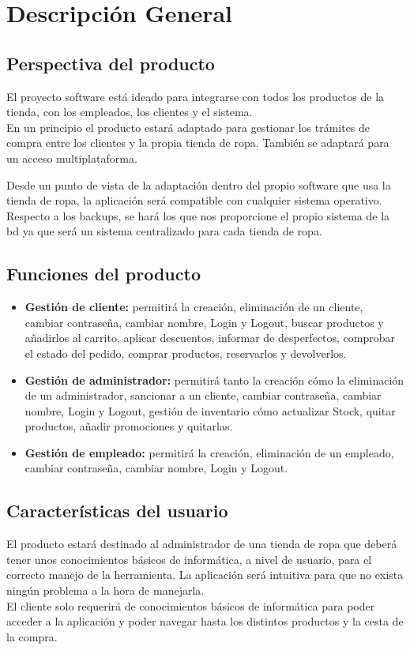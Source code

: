 \section{Descripción General }
\label{sec:desc_gen}
\subsection{Perspectiva del producto}
El proyecto software está ideado para integrarse con todos los productos de la tienda, con los empleados, los clientes y el sistema.\\
En un principio el producto estará adaptado para gestionar los trámites de compra entre los clientes y la propia tienda de ropa. También se adaptará para un acceso multiplataforma.

Desde un punto de vista de la adaptación dentro del propio software que usa la tienda de ropa, la aplicación será compatible con cualquier sistema operativo.\\
Respecto a los backups, se hará los que nos proporcione el propio sistema de la \gls{bd} ya que será un sistema centralizado para cada tienda de ropa.
\subsection{Funciones del producto}
\begin{itemize}
    \item\textbf{Gestión de cliente: }permitirá la creación, eliminación de un cliente, cambiar contraseña, cambiar nombre, Login y Logout, buscar productos y añadirlos al carrito, aplicar descuentos, informar de desperfectos, comprobar el estado del pedido, comprar productos, reservarlos y devolverlos.
    \item\textbf{Gestión de administrador: }permitirá tanto la creación cómo la eliminación de un administrador, sancionar a un cliente, cambiar contraseña, cambiar nombre, Login y Logout, gestión de inventario cómo actualizar Stock, quitar productos, añadir promociones y quitarlas.
    \item\textbf{Gestión de empleado: }permitirá la creación, eliminación de un empleado, cambiar contraseña, cambiar nombre, Login y Logout.
\end{itemize}

\subsection{Características del usuario}
El producto estará destinado al administrador de una tienda de ropa que deberá tener unos conocimientos básicos de informática, a nivel de usuario, para el correcto manejo de la herramienta. La aplicación será intuitiva para que no exista ningún problema a la hora de manejarla.\\
El cliente solo requerirá de conocimientos básicos de informática para poder acceder a la aplicación y poder navegar hasta los distintos productos y la cesta de la compra.

